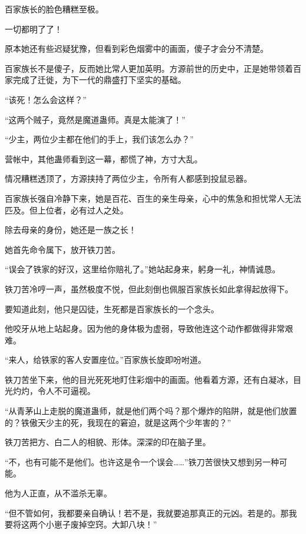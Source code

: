 
\begin{this_body}



百家族长的脸色糟糕至极。

一切都明了了！

原本她还有些迟疑犹豫，但看到彩色烟雾中的画面，傻子才会分不清楚。

百家族长不是傻子，反而她比常人更加英明。方源前世的历史中，正是她带领着百家完成了迁徙，为下一代的鼎盛打下坚实的基础。

“该死！怎么会这样？”

“这两个贼子，竟然是魔道蛊师。真是太能演了！”

“少主，两位少主都在他们的手上，我们该怎么办？”

营帐中，其他蛊师看到这一幕，都慌了神，方寸大乱。

情况糟糕透顶了，方源挟持了两位少主，令所有人都感到投鼠忌器。

百家族长强自冷静下来，她是百花、百生的亲生母亲，心中的焦急和担忧常人无法匹及。但上位者，必有过人之处。

除去母亲的身份，她还是一族之长！

她首先命令属下，放开铁刀苦。

“误会了铁家的好汉，这里给你赔礼了。”她站起身来，躬身一礼，神情诚恳。

铁刀苦冷哼一声，虽然极度不悦，但此刻倒也佩服百家族长如此拿得起放得下。

要知道此刻，他只是囚徒，生死都是百家族长的一个念头。

他咬牙从地上站起身。因为他的身体极为虚弱，导致他连这个动作都做得非常艰难。

“来人，给铁家的客人安置座位。”百家族长旋即吩咐道。

铁刀苦坐下来，他的目光死死地盯住彩烟中的画面。他看着方源，还有白凝冰，目光灼灼，令人不可逼视。

“从青茅山上走脱的魔道蛊师，就是他们两个吗？那个爆炸的陷阱，就是他们放置的？铁傲天少主的死，我现在的窘迫，就是这两个少年害的？”

铁刀苦把方、白二人的相貌、形体。深深的印在脑子里。

“不，也有可能不是他们。也许这是令一个误会……”铁刀苦很快又想到另一种可能。

他为人正直，从不滥杀无辜。

“但不管如何，我都要亲自确认！若不是，我就要追那真正的元凶。若是的。那我要将这两个小崽子废掉空窍。大卸八块！”


\end{this_body}
